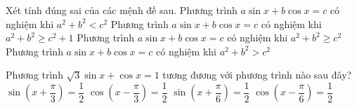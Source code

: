 

\begin{ex}%
 Xét tính đúng sai của các mệnh đề sau. 
 \choiceTF 
  {Phương trình $a\sin x+b\cos x=c$ có nghiệm khi  $a^2+b^2<c^2$}
  {\True Phương  trình $a\sin x+b\cos x=c$ có nghiệm khi $a^2+b^2\geq c^2+1$}
  {\True Phương trình $a\sin x+b\cos x=c$ có nghiệm khi $a^2+b^2\geq c^2$} 
   {\True Phương trình $a\sin x+b\cos x=c$ có nghiệm khi $a^2+b^2>c^2$}
\end{ex}

\begin{ex}%
 Phương trình  $\sqrt{3}\sin x+\cos x=1$ tương đương với phương trình nào sau đây?
  \choiceTF
   {$\sin\left(x+\dfrac{\pi}{3}\right)=\dfrac{1}{2}$}
  {\True $\cos\left(x-\dfrac{\pi}{3}\right)=\dfrac{1}{2}$} 
  {\True  $\sin\left(x+\dfrac{\pi}{6}\right)=\dfrac{1}{2}$}
  {$\cos\left(x-\dfrac{\pi}{6}\right)=\dfrac{1}{2}$} 
\end{ex}

